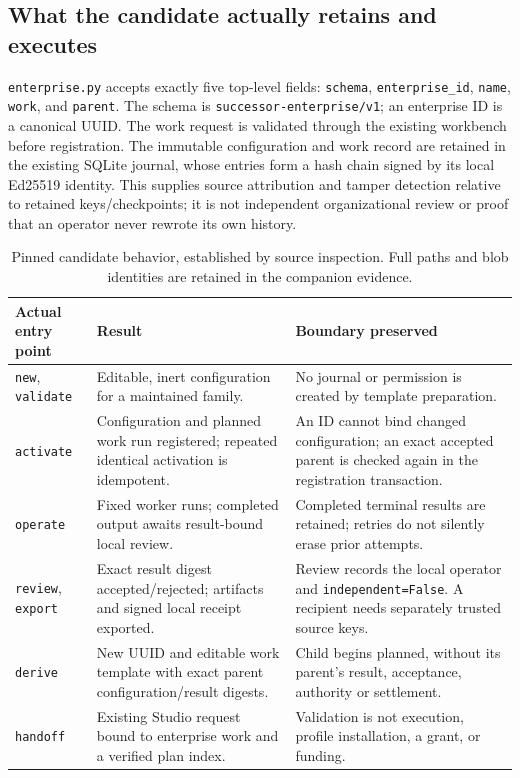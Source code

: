 \documentclass[11pt,letterpaper]{article}
\begin{document}
\subsection{What the candidate actually retains and executes}

\texttt{enterprise.\allowbreak{}py} accepts exactly five top-level fields:
\texttt{schema}, \texttt{enterprise\_\allowbreak{}id}, \texttt{name}, \texttt{work}, and
\texttt{parent}. The schema is \texttt{successor-\allowbreak{}enterprise/\allowbreak{}v1}; an enterprise ID is a canonical UUID. The work request is validated through the existing workbench before registration. The immutable configuration and work record are retained in the existing SQLite journal, whose entries form a hash chain signed by its local Ed25519 identity. This supplies source attribution and tamper detection relative to retained keys/checkpoints; it is not independent organizational review or proof that an operator never rewrote its own history.

\begin{table}[htbp]
\centering\small
\begin{tabularx}{\linewidth}{@{}p{.21\linewidth}XX@{}}
\toprule
Actual entry point & Result & Boundary preserved\\
\midrule
\texttt{new}, \texttt{validate} & Editable, inert configuration for a maintained family. & No journal or permission is created by template preparation.\\
\texttt{activate} & Configuration and planned work run registered; repeated identical activation is idempotent. & An ID cannot bind changed configuration; an exact accepted parent is checked again in the registration transaction.\\
\texttt{operate} & Fixed worker runs; completed output awaits result-bound local review. & Completed terminal results are retained; retries do not silently erase prior attempts.\\
\texttt{review}, \texttt{export} & Exact result digest accepted/rejected; artifacts and signed local receipt exported. & Review records the local operator and \texttt{independent=False}. A recipient needs separately trusted source keys.\\
\texttt{derive} & New UUID and editable work template with exact parent configuration/result digests. & Child begins planned, without its parent's result, acceptance, authority or settlement.\\
\texttt{handoff} & Existing Studio request bound to enterprise work and a verified plan index. & Validation is not execution, profile installation, a grant, or funding.\\
\bottomrule
\end{tabularx}
\caption{Pinned candidate behavior, established by source inspection. Full paths and blob identities are retained in the companion evidence.}
\end{table}
\end{document}
